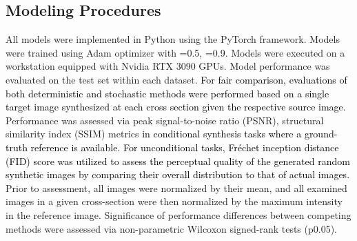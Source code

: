 \documentclass[journal,twoside,web]{ieeecolor}
\newcommand*{\revhl}{\textcolor{black}}
\begin{document}
\subsection{Modeling Procedures}
All models were implemented in Python using the PyTorch framework. Models were trained using Adam optimizer with =0.5, =0.9. Models were executed on a workstation equipped with Nvidia RTX 3090 GPUs. Model performance was evaluated on the test set within each dataset. \revhl{For fair comparison, evaluations of both deterministic and stochastic methods were performed based on a single target image synthesized at each cross section given the respective source image.} Performance was assessed via peak signal-to-noise ratio (PSNR), structural similarity index (SSIM) metrics \revhl{in conditional synthesis tasks where a ground-truth reference is available. For unconditional tasks, Fréchet inception distance (FID) score was utilized to assess the perceptual quality of the generated random synthetic images by comparing their overall distribution to that of actual images.} Prior to assessment, all images were normalized by their mean, and all examined images in a given cross-section were then normalized by the maximum intensity in the reference image. 
Significance of performance differences between competing methods were assessed via non-parametric Wilcoxon signed-rank tests (p0.05).  
\end{document}
